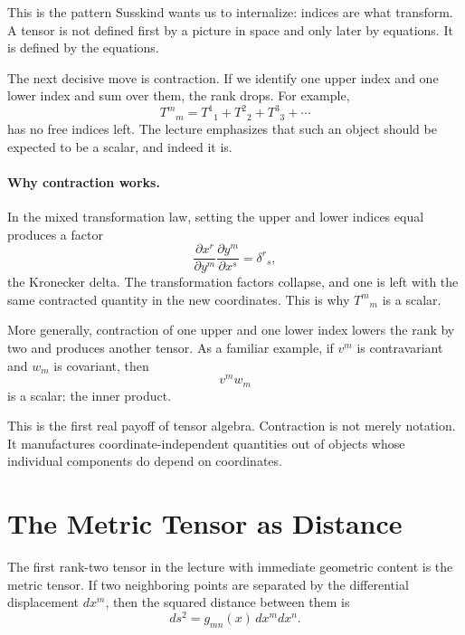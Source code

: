 This is the pattern Susskind wants us to internalize: indices are what transform. A tensor is not defined first by a picture in space and only later by equations. It is defined by the equations.

The next decisive move is contraction. If we identify one upper index and one lower index and sum over them, the rank drops. For example,
\begin{equation}
T^m{}_{m}=T^1{}_{1}+T^2{}_{2}+T^3{}_{3}+\cdots
\end{equation}
has no free indices left. The lecture emphasizes that such an object should be expected to be a scalar, and indeed it is.

\paragraph{Why contraction works.} In the mixed transformation law, setting the upper and lower indices equal produces a factor
\begin{equation}
\frac{\partial x^r}{\partial y^m}\frac{\partial y^m}{\partial x^s}
=
\delta^r{}_{s},
\end{equation}
the Kronecker delta. The transformation factors collapse, and one is left with the same contracted quantity in the new coordinates. This is why \(T^m{}_{m}\) is a scalar.

More generally, contraction of one upper and one lower index lowers the rank by two and produces another tensor. As a familiar example, if \(v^m\) is contravariant and \(w_m\) is covariant, then
\begin{equation}
v^m w_m
\end{equation}
is a scalar: the inner product.

This is the first real payoff of tensor algebra. Contraction is not merely notation. It manufactures coordinate-independent quantities out of objects whose individual components do depend on coordinates.

\section{The Metric Tensor as Distance}

The first rank-two tensor in the lecture with immediate geometric content is the metric tensor. If two neighboring points are separated by the differential displacement \(dx^m\), then the squared distance between them is
\begin{equation}
ds^2=g_{mn}(x)\,dx^m dx^n.
\end{equation}

